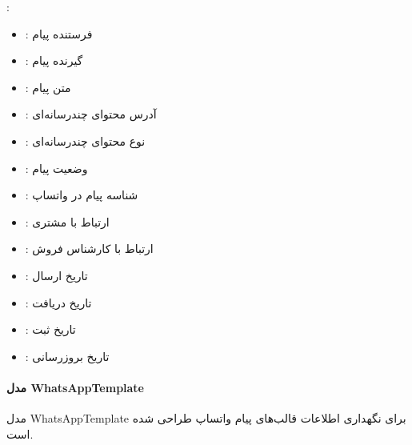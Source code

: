 \documentclass[letterpaper,10pt,english]{sphinxmanual}
\begin{document}
\sphinxAtStartPar
{}:
\begin{itemize}
\item {} 
\sphinxAtStartPar
{}: فرستنده پیام

\item {} 
\sphinxAtStartPar
{}: گیرنده پیام

\item {} 
\sphinxAtStartPar
{}: متن پیام

\item {} 
\sphinxAtStartPar
{}: آدرس محتوای چندرسانه‌ای

\item {} 
\sphinxAtStartPar
{}: نوع محتوای چندرسانه‌ای

\item {} 
\sphinxAtStartPar
{}: وضعیت پیام

\item {} 
\sphinxAtStartPar
{}: شناسه پیام در واتساپ

\item {} 
\sphinxAtStartPar
{}: ارتباط با مشتری

\item {} 
\sphinxAtStartPar
{}: ارتباط با کارشناس فروش

\item {} 
\sphinxAtStartPar
{}: تاریخ ارسال

\item {} 
\sphinxAtStartPar
{}: تاریخ دریافت

\item {} 
\sphinxAtStartPar
{}: تاریخ ثبت

\item {} 
\sphinxAtStartPar
{}: تاریخ بروزرسانی

\end{itemize}


\paragraph{مدل WhatsAppTemplate}
\label{\detokenize{modules/whatsapp_api:whatsapptemplate}}
\sphinxAtStartPar
مدل WhatsAppTemplate برای نگهداری اطلاعات قالب‌های پیام واتساپ طراحی شده است.
\end{document}

